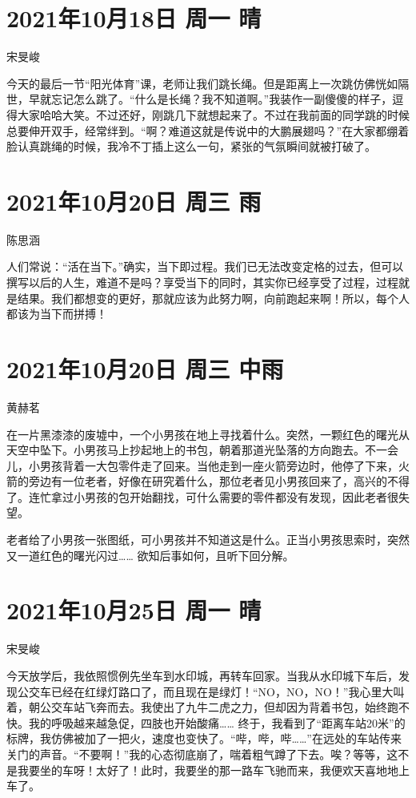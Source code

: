 \section{2021年10月18日 周一 晴}

宋旻峻

今天的最后一节“阳光体育”课，老师让我们跳长绳。但是距离上一次跳仿佛恍如隔世，早就忘记怎么跳了。“什么是长绳？我不知道啊。”我装作一副傻傻的样子，逗得大家哈哈大笑。不过还好，刚跳几下就想起来了。不过在我前面的同学跳的时候总要伸开双手，经常绊到。“啊？难道这就是传说中的大鹏展翅吗？”在大家都绷着脸认真跳绳的时候，我冷不丁插上这么一句，紧张的气氛瞬间就被打破了。

\section{2021年10月20日 周三 雨}

陈思涵

人们常说：“活在当下。”确实，当下即过程。我们已无法改变定格的过去，但可以撰写以后的人生，难道不是吗？享受当下的同时，其实你已经享受了过程，过程就是结果。我们都想变的更好，那就应该为此努力啊，向前跑起来啊！所以，每个人都该为当下而拼搏！

\section{2021年10月20日 周三 中雨}

黄赫茗

在一片黑漆漆的废墟中，一个小男孩在地上寻找着什么。突然，一颗红色的曙光从天空中坠下。小男孩马上抄起地上的书包，朝着那道光坠落的方向跑去。不一会儿，小男孩背着一大包零件走了回来。当他走到一座火箭旁边时，他停了下来，火箭的旁边有一位老者，好像在研究着什么，那位老者见小男孩回来了，高兴的不得了。连忙拿过小男孩的包开始翻找，可什么需要的零件都没有发现，因此老者很失望。

老者给了小男孩一张图纸，可小男孩并不知道这是什么。正当小男孩思索时，突然又一道红色的曙光闪过…… 欲知后事如何，且听下回分解。

\section{2021年10月25日 周一 晴}

宋旻峻

今天放学后，我依照惯例先坐车到水印城，再转车回家。当我从水印城下车后，发现公交车已经在红绿灯路口了，而且现在是绿灯！“NO，NO，NO！”我心里大叫着，朝公交车站飞奔而去。我使出了九牛二虎之力，但却因为背着书包，始终跑不快。我的呼吸越来越急促，四肢也开始酸痛…… 终于，我看到了“距离车站20米”的标牌，我仿佛被加了一把火，速度也变快了。“哔，哔，哔……”在远处的车站传来关门的声音。“不要啊！”我的心态彻底崩了，喘着粗气蹲了下去。唉？等等，这不是我要坐的车呀！太好了！此时，我要坐的那一路车飞驰而来，我便欢天喜地地上车了。

